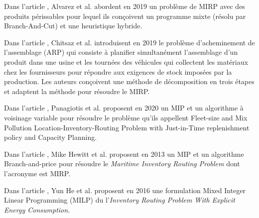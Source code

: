 Dans l'article \cite{IRP_Alvarez_2019}, Alvarez et al. abordent en 2019 un problème de MIRP avec des produits périssables pour lequel ils conçoivent un programme mixte (résolu par Branch-And-Cut) et une heuristique hybride. 

Dans l'article \cite{IRP_Chitsaz}, Chitsaz et al. introduisent en 2019 le problème d'acheminement de l'assemblage (ARP) qui consiste à planifier simultanément l'assemblage d'un produit dans une usine et les tournées des véhicules qui collectent les matériaux chez les fournisseurs pour répondre aux exigences de stock imposées par la production. Les auteurs conçoivent une méthode de décomposition en trois étapes et adaptent la méthode pour résoudre le MIRP.

Dans l'article \cite{PRP_Panagiotis_2020}, Panagiotis et al. proposent en 2020 un MIP et un algorithme à voisinage variable pour résoudre le problème qu'ils appellent Fleet-size and Mix Pollution Location-Inventory-Routing Problem with Just-in-Time replenishment policy and Capacity Planning. 

Dans l'article \cite{IRP_Hewitt}, Mike	Hewitt et al. proposent en 2013 un MIP et un algorithme Branch-and-price pour résoudre le \textit{Maritime Inventory Routing Problem}  dont l'acronyme est MIRP.

Dans l'article \cite{article_GVRP5}, Yun He et al. proposent en 2016 une formulation Mixed Integer Linear Programming (MILP) du l'\textit{Inventory Routing Problem With Explicit Energy Consumption}.










